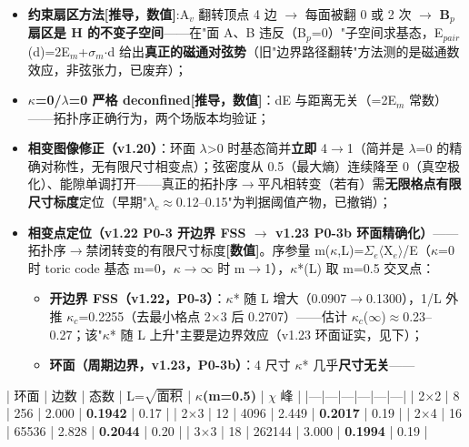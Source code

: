 \documentclass[UTF8,fontset=windows]{csoarticle}
\newcommand{\mtag}[1]{\textbf{[#1]}}
\newcommand{\down}[1]{\ensuremath{_{#1}}}
\begin{document}
\begin{itemize}
\item \textbf{约束扇区方法\mtag{推导，数值}}:A\down{v} 翻转顶点 4 边 \ensuremath{\to} 每面被翻 0 或 2 次 \ensuremath{\to} \textbf{B\down{p} 扇区是 H 的不变子空间}------在"面 A、B 违反（B\down{p}=0）"子空间求基态，E\down{pair}(d)=2E\down{m}+\ensuremath{\sigma}\down{m}\ensuremath{\cdot}d 给出\textbf{真正的磁通对弦势}（旧"边界路径翻转"方法测的是磁通数效应，非弦张力，已废弃）；
\item \textbf{\ensuremath{\kappa}=0/\ensuremath{\lambda}=0 严格 deconfined}\mtag{推导，数值}：dE 与距离无关（=2E\down{m} 常数）------拓扑序正确行为，两个场版本均验证；
\item \textbf{相变图像修正（v1.20）}：环面 \ensuremath{\lambda}>0 时基态简并\textbf{立即} 4\ensuremath{\to}1（简并是 \ensuremath{\lambda}=0 的精确对称性，无有限尺寸相变点）；弦密度从 0.5（最大熵）连续降至 0（真空极化）、能隙单调打开------真正的拓扑序\ensuremath{\to}平凡相转变（若有）需\textbf{无限格点有限尺寸标度}定位（早期"\ensuremath{\lambda}\down{c}\ensuremath{\approx}0.12--0.15"为判据阈值产物，已撤销）；
\item \textbf{相变点定位（v1.22 P0-3 开边界 FSS \ensuremath{\to} v1.23 P0-3b 环面精确化）}------拓扑序\ensuremath{\to}禁闭转变的有限尺寸标度\mtag{数值}。序参量 m(\ensuremath{\kappa},L)=\ensuremath{\Sigma}\down{e}\ensuremath{\langle}X\down{e}\ensuremath{\rangle}/E（\ensuremath{\kappa}=0 时 toric code 基态 m=0，\ensuremath{\kappa}\ensuremath{\to}\ensuremath{\infty} 时 m\ensuremath{\to}1），\ensuremath{\kappa}*(L) 取 m=0.5 交叉点：
\begin{itemize}
\item \textbf{开边界 FSS（v1.22，P0-3）}：\ensuremath{\kappa}* 随 L 增大（0.0907\ensuremath{\to}0.1300），1/L 外推 \ensuremath{\kappa}\down{c}=0.2255（去最小格点 2\ensuremath{\times}3 后 0.2707）------估计 \ensuremath{\kappa}\down{c}(\ensuremath{\infty})\ensuremath{\approx}0.23--0.27；该"\ensuremath{\kappa}* 随 L 上升"主要是边界效应（v1.23 环面证实，见下）；
\item \textbf{环面（周期边界，v1.23，P0-3b）}：4 尺寸 \ensuremath{\kappa}* 几乎\textbf{尺寸无关}------
\end{itemize}
\end{itemize}

    | 环面 | 边数 | 态数 | L=\ensuremath{\sqrt{面积}} | \textbf{\ensuremath{\kappa}\*(m=0.5)} | \ensuremath{\chi} 峰 |
    |---|---|---|---|---|---|
    | 2\ensuremath{\times}2 | 8 | 256 | 2.000 | \textbf{0.1942} | 0.17 |
    | 2\ensuremath{\times}3 | 12 | 4096 | 2.449 | \textbf{0.2017} | 0.19 |
    | 2\ensuremath{\times}4 | 16 | 65536 | 2.828 | \textbf{0.2044} | 0.20 |
    | 3\ensuremath{\times}3 | 18 | 262144 | 3.000 | \textbf{0.1994} | 0.19 |
\end{document}
